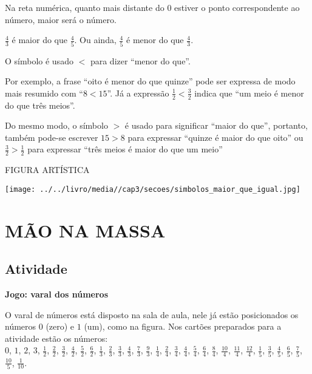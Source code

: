 Na reta numérica, quanto mais distante do 0 estiver o ponto correspondente ao número, maior será o número. 
\begin{center}
\end{center}

$\frac{4}{3}$ é maior do que $\frac{4}{5}$. Ou ainda, $\frac{4}{5}$ é menor do que $\frac{4}{3}$.


O símbolo é usado $<$ para dizer ``menor do que''.

Por exemplo, a frase ``oito é menor do que quinze'' pode ser expressa de modo mais resumido com ``$8<15$''. Já a expressão $\frac{1}{2}<\frac{3}{2}$ indica que ``um meio é menor do que três meios''.

Do mesmo modo, o símbolo $>$ é usado para significar ``maior do que'', portanto, também pode-se escrever $15>8$ para expressar ``quinze é maior do que oito'' ou $\frac{3}{2}>\frac{1}{2}$  para expressar ``três meios é maior do que um meio''

\begin{imagem*}[breakable]{}{}   FIGURA ARTÍSTICA  
  
    \texttt{[image: ../../livro/media//cap3/secoes/simbolos\_maior\_que\_igual.jpg]}   \end{imagem*}

\section{MÃO NA MASSA }

\subsection{Atividade}

{\bf Jogo: varal dos números}

O varal de números está disposto na sala de aula, nele já estão posicionados os números $0$ (zero) e $1$ (um), como na figura. Nos cartões preparados para a atividade estão os números: \\
$0$, $1$, $2$, $3$, $\frac{1}{2}$, $\frac{2}{2}$, $\frac{3}{2}$, $\frac{4}{2}$, $\frac{5}{2}$, $\frac{6}{2}$,
$\frac{1}{3}$, $\frac{2}{3}$, $\frac{3}{3}$, $\frac{4}{3}$, $\frac{7}{3}$, $\frac{9}{3}$,
$\frac{1}{4}$, $\frac{2}{4}$, $\frac{3}{4}$, $\frac{4}{4}$, $\frac{5}{4}$, $\frac{6}{4}$, $\frac{8}{4}$, $\frac{10}{4}$, $\frac{11}{4}$, $\frac{12}{4}$,
$\frac{1}{5}$, $\frac{3}{5}$, $\frac{4}{5}$, $\frac{6}{5}$, $\frac{7}{5}$, $\frac{10}{5}$,
$\frac{1}{10}$.

